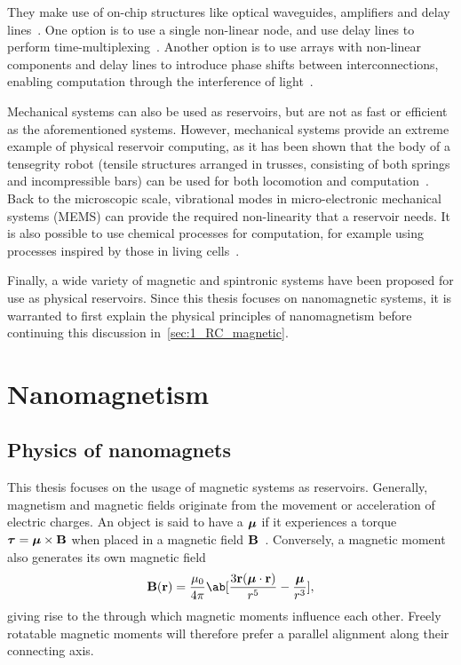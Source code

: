 They make use of on-chip structures like optical waveguides, amplifiers and delay lines~\cite{RC_RecentAdvances}.
One option is to use a single non-linear node, and use delay lines to perform time-multiplexing~\cite{appeltant2011information,RC_AllOptical}.
Another option is to use arrays with non-linear components and delay lines to introduce phase shifts between interconnections, enabling computation through the interference of light~\cite{RC_Photonic,RC_PhotonicSi}. \par
Mechanical systems can also be used as reservoirs, but are not as fast or efficient as the aforementioned systems.
However, mechanical systems provide an extreme example of physical reservoir computing, as it has been shown that the body of a tensegrity robot (tensile structures arranged in trusses, consisting of both springs and incompressible bars) can be used for both locomotion and computation~\cite{RC_Tensegrity}.
Back to the microscopic scale, vibrational modes in micro-electronic mechanical systems (MEMS) can provide the required non-linearity that a reservoir needs.
It is also possible to use chemical processes for computation, for example using processes inspired by those in living cells~\cite{NanoscaleRC,ElectrochemicalPRC,RC_Chemical}. \par
Finally, a wide variety of magnetic and spintronic systems have been proposed for use as physical reservoirs.
Since this thesis focuses on nanomagnetic systems, it is warranted to first explain the physical principles of nanomagnetism before continuing this discussion in~\cref{sec:1_RC_magnetic}.

\newpage
\section{Nanomagnetism}
\subsection{Physics of nanomagnets}
This thesis focuses on the usage of magnetic systems as reservoirs.
Generally, magnetism and magnetic fields originate from the movement or acceleration of electric charges.
An object is said to have a  $\boldsymbol{\mathbf{\mu}}$ if it experiences a torque $\boldsymbol{\mathbf{\tau}} = \boldsymbol{\mathbf{\mu}} \times \boldsymbol{\mathbf{B}}$ when placed in a magnetic field $\boldsymbol{\mathbf{B}}$~\cite{IntroMagneticMaterials}.
Conversely, a magnetic moment also generates its own magnetic field
\begin{equation}
	\vc{B}(\vc{r}) = \frac{\mu_0}{4 \pi} \ab[\frac{3 \vc{r} (\vc{\mu} \cdot \vc{r})}{r^5} - \frac{\vc{\mu}}{r^3}] \mathrm{,}
\end{equation}
giving rise to the  through which magnetic moments influence each other. %
Freely rotatable magnetic moments will therefore prefer a parallel alignment along their connecting axis.

